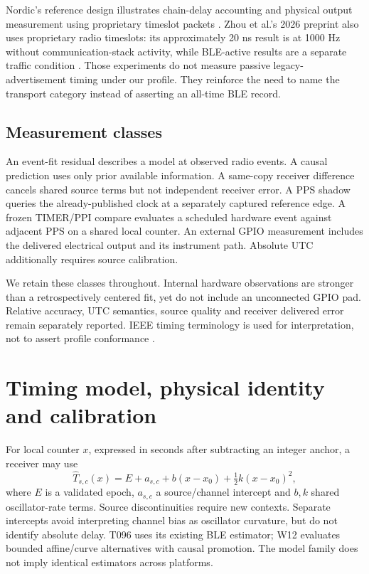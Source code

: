 \documentclass[11pt,letterpaper]{article}
\newcommand{\page}{\clearpage}
\begin{document}
Nordic's reference design illustrates chain-delay accounting and physical output measurement using proprietary timeslot packets \cite{nordic}. Zhou et al.'s 2026 preprint also uses proprietary radio timeslots: its approximately 20 ns result is at 1000 Hz without communication-stack activity, while BLE-active results are a separate traffic condition \cite{zhou}. Those experiments do not measure passive legacy-advertisement timing under our profile. They reinforce the need to name the transport category instead of asserting an all-time BLE record.

\subsection{Measurement classes}
An event-fit residual describes a model at observed radio events. A causal prediction uses only prior available information. A same-copy receiver difference cancels shared source terms but not independent receiver error. A PPS shadow queries the already-published clock at a separately captured reference edge. A frozen TIMER/PPI compare evaluates a scheduled hardware event against adjacent PPS on a shared local counter. An external GPIO measurement includes the delivered electrical output and its instrument path. Absolute UTC additionally requires source calibration.

We retain these classes throughout. Internal hardware observations are stronger than a retrospectively centered fit, yet do not include an unconnected GPIO pad. Relative accuracy, UTC semantics, source quality and receiver delivered error remain separately reported. IEEE timing terminology is used for interpretation, not to assert profile conformance \cite{ptp}.
\page
\section{Timing model, physical identity and calibration}
For local counter $x$, expressed in seconds after subtracting an integer anchor, a receiver may use
\begin{equation}
\widehat T_{s,c}(x)=E+a_{s,c}+b(x-x_0)+\tfrac12 k(x-x_0)^2,
\end{equation}
where $E$ is a validated epoch, $a_{s,c}$ a source/channel intercept and $b,k$ shared oscillator-rate terms. Source discontinuities require new contexts. Separate intercepts avoid interpreting channel bias as oscillator curvature, but do not identify absolute delay. T096 uses its existing BLE estimator; W12 evaluates bounded affine/curve alternatives with causal promotion. The model family does not imply identical estimators across platforms.
\end{document}
